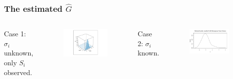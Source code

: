 \documentclass[10pt,mathserif,aspectratio=169]{beamer}
\begin{document}
\begin{frame}
  \frametitle{ The estimated $\hat{G}$}
  \begin{columns}[T,onlytextwidth]
    Case 1: $\sigma_i$ unknown, only $S_i$ observed.
    \begin{figure}
      \centering
      \includegraphics[width=\textwidth]{../../Figures/2013-2022/GMM_m/GLVmix_s.pdf}
    \end{figure}

    Case 2: $\sigma_i$ known.
    \begin{figure}
      \centering
      \includegraphics[width=0.9\textwidth]{../../Figures/2013-2022/GMM_m/GLmix_s.pdf}
    \end{figure}
  \end{columns}
\end{frame}
\end{document}
